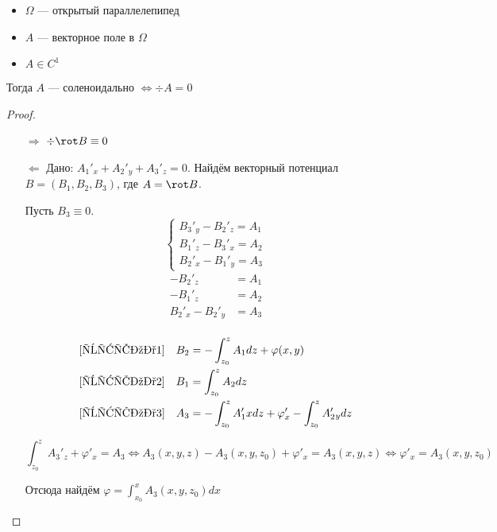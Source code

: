 \begin{theorem}[Пуанкаре\({}'\)]\itemfix
    \begin{itemize}
        \item \(\Omega\) --- открытый параллелепипед
        \item \(A\) --- векторное поле в \(\Omega\)
        \item \(A \in C^1\)
    \end{itemize}

    Тогда \(A\) --- соленоидально \(\Leftrightarrow \div A = 0\)
\end{theorem}
\begin{proof}
    \begin{itemize}
        \item [\( \Rightarrow \)] \(\div \rot B \equiv 0\)
        \item [\( \Leftarrow \)] Дано: \(A_{1}'{}_x + A_2'{}_y + A_3'{}_z = 0\). Найдём векторный потенциал \(B = (B_1, B_2, B_3)\), где \(A = \rot B\).

              Пусть \(B_3 \equiv 0\).
              \[\begin{cases} B_3'{}_y - B_2'{}_z = A_1 \\ B_1'{}_z - B_3'{}_x = A_2 \\ B_2'{}_x - B_1'{}_y = A_3 \end{cases}\]
              \begin{align}
                  - B_2'{}_z          & = A_1 \label{штука1} \\
                  - B_1'{}_z          & = A_2 \label{штука2} \\
                  B_2'{}_x - B_2'{}_y & = A_3 \label{штука3} \\
              \end{align}

              \begin{align*}
                  \eqref{штука1} \quad B_2 & = - \int_{z_0}^z A_1 dz + \varphi(x, y)                           \\
                  \eqref{штука2} \quad B_1 & = \int_{z_0}^z A_2 dz                                             \\
                  \eqref{штука3} \quad A_3 & =  -\int_{z_0}^z A_1'x dz + \varphi'_x - \int_{z_0}^z A_2'{}_y dz \\
              \end{align*}

              \[\int_{z_0}^z A_3'{}_z + \varphi'_x = A_3 \Leftrightarrow A_3(x, y, z) - A_3(x, y, z_0) + \varphi'_x = A_3(x, y, z) \Leftrightarrow \varphi'_x = A_3(x, y, z_0)\]

              Отсюда найдём \(\varphi = \int_{x_0}^x A_3(x, y, z_0)dx\)
    \end{itemize}
\end{proof}

